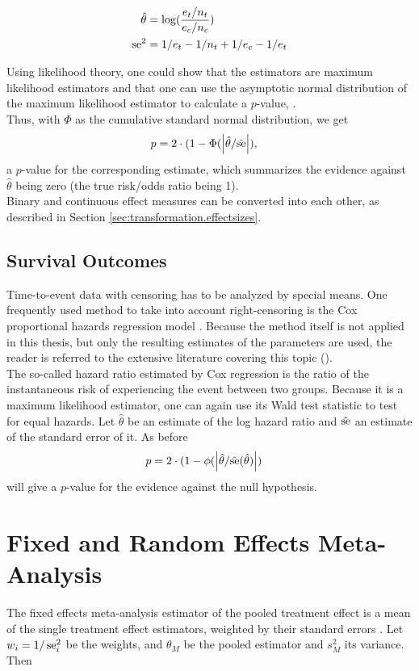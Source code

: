 \documentclass[11pt,a4paper,twoside]{book}\usepackage[]{graphicx}\usepackage[]{color}
\begin{document}
\begin{align}
\hat{\theta} &= \log(\frac{e_t/n_t}{e_c/n_c}) \label{eq:risk.ratio} \\
\operatorname{se}^2&= 1/e_t - 1/n_t + 1/e_c - 1/e_t \label{eq:risk.ratio.variance}
\end{align}

Using likelihood theory, one could show that the estimators are maximum likelihood estimators and that one can use the asymptotic normal distribution of the maximum likelihood estimator to calculate a $p$-value, \eg \cite[98]{held2014}. \\
Thus, with $\Phi$ as the cumulative standard normal distribution, we get
\begin{align}
p &= 2\cdot(1-\Phi(\left\lvert\hat{\theta}/\hat{\operatorname{se}}\right\rvert), \nonumber
\end{align}
a $p$-value for the corresponding estimate, which summarizes the evidence against $\hat{\theta}$ being zero (\ie the true risk/odds ratio being 1). \\
Binary and continuous effect measures can be converted into each other, as described in Section \ref{sec:transformation.effectsizes}.

\subsection{Survival Outcomes}
Time-to-event data with censoring has to be analyzed by special means. One frequently used method to take into account right-censoring is the Cox proportional hazards regression model \citep{Cox}. Because the method itself is not applied in this thesis, but only the resulting estimates of the parameters are used, the reader is referred to the extensive literature covering this topic (\eg \citet{Surv}). \\
The so-called hazard ratio estimated by Cox regression is the ratio of the instantaneous risk of experiencing the event between two groups. Because it is a maximum likelihood estimator, one can again use its Wald test statistic to test for equal hazards. Let $\hat{\theta}$ be an estimate of the log hazard ratio and $\hat{\operatorname{se}}$ an estimate of the standard error of it. As before
\begin{align}
p &= 2\cdot(1-\phi(\left\lvert\hat{\theta}/\hat{\operatorname{se}}(\hat{\theta})\right\rvert) \nonumber
\end{align}
will give a $p$-value for the evidence against the null hypothesis.



\section{Fixed and Random Effects Meta-Analysis} \label{sec:meta.analysis}
The fixed effects meta-analysis estimator of the pooled treatment effect is a mean of the single treatment effect estimators, weighted by their standard errors \citep{fixed.effects.rosenthal}. Let $w_i = 1/\operatorname{se}_i^2$ be the weights, and $\theta_M$ be the pooled estimator and $s_M^2$ its variance. Then 
\end{document}
